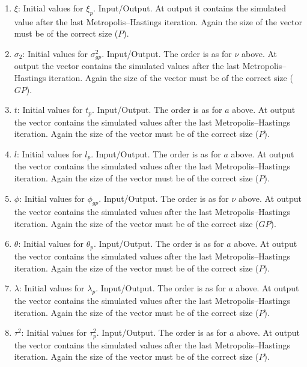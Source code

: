 \documentclass[11pt]{article}
\begin{document}
\begin{enumerate}
\item $\xi$: Initial values for $\xi_p$. Input/Output.
At output it contains the simulated value after the last Metropolis--Hastings iteration.
Again the size of the vector must be of the correct size ($P$).

\item $\sigma_2$: Initial values for $\sigma^2_{gp}$. Input/Output. The order is as for $\nu$ above.
At output
the vector contains the simulated values after the last Metropolis--Hastings iteration.
Again the size of the vector must be of the correct size ($GP$).

\item $t$: Initial values for $t_{p}$. Input/Output. The order is as for $a$ above.
At output
the vector contains the simulated values after the last Metropolis--Hastings iteration.
Again the size of the vector must be of the correct size ($P$).

\item $l$: Initial values for $l_{p}$. Input/Output. The order is as for $a$ above.
At output
the vector contains the simulated values after the last Metropolis--Hastings iteration.
Again the size of the vector must be of the correct size ($P$).

\item $\phi$: Initial values for $\phi_{gp}$. Input/Output. The order is as for $\nu$ above.
At output
the vector contains the simulated values after the last Metropolis--Hastings iteration.
Again the size of the vector must be of the correct size ($GP$).

\item $\theta$: Initial values for $\theta_{p}$. Input/Output. The order is as for $a$ above.
At output
the vector contains the simulated values after the last Metropolis--Hastings iteration.
Again the size of the vector must be of the correct size ($P$).

\item $\lambda$: Initial values for $\lambda_{p}$. Input/Output. The order is as for $a$ above.
At output
the vector contains the simulated values after the last Metropolis--Hastings iteration.
Again the size of the vector must be of the correct size ($P$).

\item $\tau^2$: Initial values for $\tau^2_{p}$. Input/Output. The order is as for $a$ above.
At output
the vector contains the simulated values after the last Metropolis--Hastings iteration.
Again the size of the vector must be of the correct size ($P$).


\end{enumerate}
\end{document}
